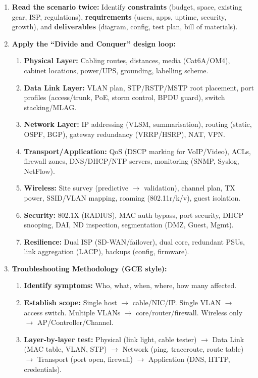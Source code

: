 \documentclass[11pt]{article}
\begin{document}
\begin{methode}
\begin{enumerate}
\item \textbf{Read the scenario twice:} Identify \textbf{constraints} (budget, space, existing gear, ISP, regulations), \textbf{requirements} (users, apps, uptime, security, growth), and \textbf{deliverables} (diagram, config, test plan, bill of materials).
\item \textbf{Apply the ``Divide and Conquer'' design loop:}
      \begin{enumerate}
      \item \textbf{Physical Layer:} Cabling routes, distances, media (Cat6A/OM4), cabinet locations, power/UPS, grounding, labelling scheme.
      \item \textbf{Data Link Layer:} VLAN plan, STP/RSTP/MSTP root placement, port profiles (access/trunk, PoE, storm control, BPDU guard), switch stacking/MLAG.
      \item \textbf{Network Layer:} IP addressing (VLSM, summarisation), routing (static, OSPF, BGP), gateway redundancy (VRRP/HSRP), NAT, VPN.
      \item \textbf{Transport/Application:} QoS (DSCP marking for VoIP/Video), ACLs, firewall zones, DNS/DHCP/NTP servers, monitoring (SNMP, Syslog, NetFlow).
      \item \textbf{Wireless:} Site survey (predictive $\rightarrow$ validation), channel plan, TX power, SSID/VLAN mapping, roaming (802.11r/k/v), guest isolation.
      \item \textbf{Security:} 802.1X (RADIUS), MAC auth bypass, port security, DHCP snooping, DAI, ND inspection, segmentation (DMZ, Guest, Mgmt).
      \item \textbf{Resilience:} Dual ISP (SD-WAN/failover), dual core, redundant PSUs, link aggregation (LACP), backups (config, firmware).
      \end{enumerate}
\item \textbf{Troubleshooting Methodology (GCE style):}
      \begin{enumerate}
      \item \textbf{Identify symptoms:} Who, what, when, where, how many affected.
      \item \textbf{Establish scope:} Single host $\rightarrow$ cable/NIC/IP. Single VLAN $\rightarrow$ access switch. Multiple VLANs $\rightarrow$ core/router/firewall. Wireless only $\rightarrow$ AP/Controller/Channel.
      \item \textbf{Layer-by-layer test:} Physical (link light, cable tester) $\rightarrow$ Data Link (MAC table, VLAN, STP) $\rightarrow$ Network (ping, traceroute, route table) $\rightarrow$ Transport (port open, firewall) $\rightarrow$ Application (DNS, HTTP, credentials).

\end{enumerate}
\end{enumerate}
\end{methode}
\end{document}
